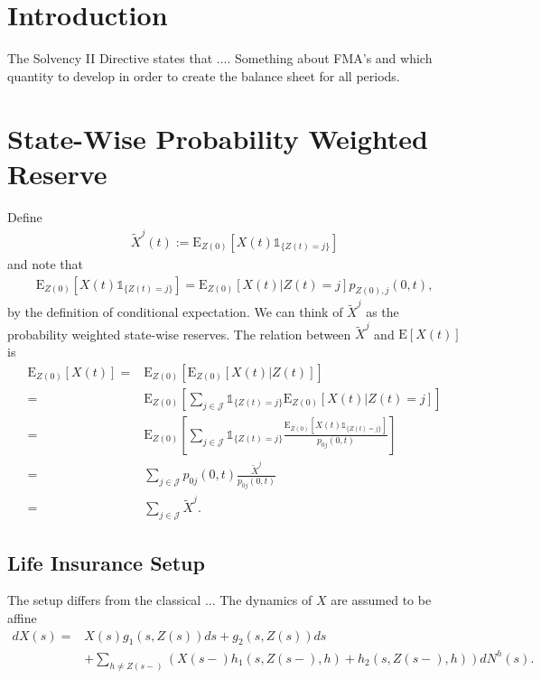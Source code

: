 \documentclass[12pt]{article}
\newcommand{\E}{\text{E}}
\newcommand{\indic}[1]{\mathds{1}_{ \{ #1 \} }}
\begin{document}
\section*{Introduction}
The Solvency II Directive states that .... Something about FMA's and which quantity to develop in order to create the balance sheet for all periods.


\section*{State-Wise Probability Weighted Reserve}
Define
\begin{align*}
\tilde{X}^j(t):=\E_{Z(0)}[X(t)\indic{Z(t)=j}]
\end{align*}
and note that
\begin{align}
\E_{Z(0)}[X(t)\indic{Z(t)=j}]= \E_{Z(0)}[X(t)|Z(t)=j]p_{Z(0),j}(0,t), \label{eq:1}
\end{align}
by the definition of conditional expectation. We can think of $\tilde{X}^j$ as the probability weighted state-wise reserves. The relation between $\tilde{X}^j$ and $\E[X(t)]$ is
\begin{align*}
\E_{Z(0)}[X(t)] =& \E_{Z(0)}[\E_{Z(0)} [ X(t)|Z(t)]] 
\\
=&
\E_{Z(0)} \left[ \sum_{j\in \mathcal{J}} \indic{Z(t)=j} \E_{Z(0)} [ X(t)|Z(t)=j] \right]
\\
=&
\E_{Z(0)} \left[ \sum_{j\in \mathcal{J}} \indic{Z(t)=j} \frac{\E_{Z(0)}[X(t)\indic{Z(t)=j}]}{p_{0j}(0,t)} \right]
\\
=&
\sum_{j\in \mathcal{J}} p_{0j}(0,t) \frac{ \tilde{X}^j}{p_{0j}(0,t)}
\\
=&
\sum_{j\in \mathcal{J}} \tilde{X}^j.
\end{align*}

\subsection*{Life Insurance Setup}
The setup differs from the classical ...
The dynamics of $X$ are assumed to be affine
\begin{align*}
dX(s)=&X(s)g_1(s,Z(s))ds+g_2(s,Z(s))ds\\
&+\sum_{h\neq Z(s-)} \left( X(s-)h_1(s,Z(s-),h)+ h_2(s,Z(s-),h)\right) dN^h(s).
\end{align*}
\end{document}
